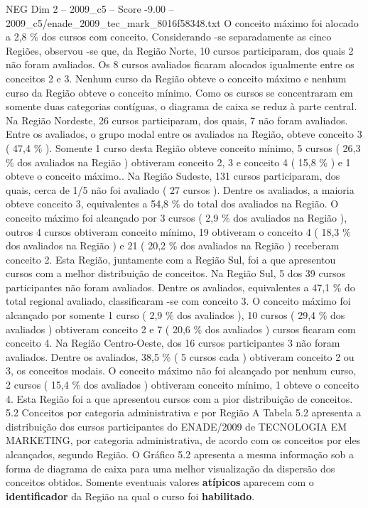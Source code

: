 \begin{textsample}{NEG Dim 2 – 2009\_c5 – Score -9.00 – 2009\_c5/enade\_2009\_tec\_mark\_8016f58348.txt}
O conceito máximo foi alocado a 2,8 \% dos cursos com conceito.
Considerando -se separadamente as cinco Regiões, observou -se que, da Região Norte, 10 cursos participaram, dos quais 2 não foram avaliados.
Os 8 cursos avaliados ficaram alocados igualmente entre os conceitos 2 e 3.
Nenhum curso da Região obteve o conceito máximo e nenhum curso da Região obteve o conceito mínimo.
Como os cursos se concentraram em somente duas categorias contíguas, o diagrama de caixa se reduz à parte central.
Na Região Nordeste, 26 cursos participaram, dos quais, 7 não foram avaliados.
Entre os avaliados, o grupo modal entre os avaliados na Região, obteve conceito 3 ( 47,4 \% ).
Somente 1 curso desta Região obteve conceito mínimo, 5 cursos ( 26,3 \% dos avaliados na Região ) obtiveram conceito 2, 3 e conceito 4 ( 15,8 \% ) e 1 obteve o conceito máximo..
Na Região Sudeste, 131 cursos participaram, dos quais, cerca de 1/5 não foi avaliado ( 27 cursos ).
Dentre os avaliados, a maioria obteve conceito 3, equivalentes a 54,8 \% do total dos avaliados na Região.
O conceito máximo foi alcançado por 3 cursos ( 2,9 \% dos avaliados na Região ), outros 4 cursos obtiveram conceito mínimo, 19 obtiveram o conceito 4 ( 18,3 \% dos avaliados na Região ) e 21 ( 20,2 \% dos avaliados na Região ) receberam conceito 2.
Esta Região, juntamente com a Região Sul, foi a que apresentou cursos com a melhor distribuição de conceitos.
Na Região Sul, 5 dos 39 cursos participantes não foram avaliados.
Dentre os avaliados, equivalentes a 47,1 \% do total regional avaliado, classificaram -se com conceito 3.
O conceito máximo foi alcançado por somente 1 curso ( 2,9 \% dos avaliados ), 10 cursos ( 29,4 \% dos avaliados ) obtiveram conceito 2 e 7 ( 20,6 \% dos avaliados ) cursos ficaram com conceito 4.
Na Região Centro-Oeste, dos 16 cursos participantes 3 não foram avaliados.
Dentre os avaliados, 38,5 \% ( 5 cursos cada ) obtiveram conceito 2 ou 3, os conceitos modais.
O conceito máximo não foi alcançado por nenhum curso, 2 cursos ( 15,4 \% dos avaliados ) obtiveram conceito mínimo, 1 obteve o conceito 4.
Esta Região foi a que apresentou cursos com a pior distribuição de conceitos. 5.2 Conceitos por categoria administrativa e por Região A Tabela 5.2 apresenta a distribuição dos cursos participantes do ENADE/2009 de TECNOLOGIA EM MARKETING, por categoria administrativa, de acordo com os conceitos por eles alcançados, segundo Região.
O Gráfico 5.2 apresenta a mesma informação sob a forma de diagrama de caixa para uma melhor visualização da dispersão dos conceitos obtidos.
Somente eventuais valores \textbf{atípicos} aparecem com o \textbf{identificador} da Região na qual o curso foi \textbf{habilitado}.

\end{textsample}
